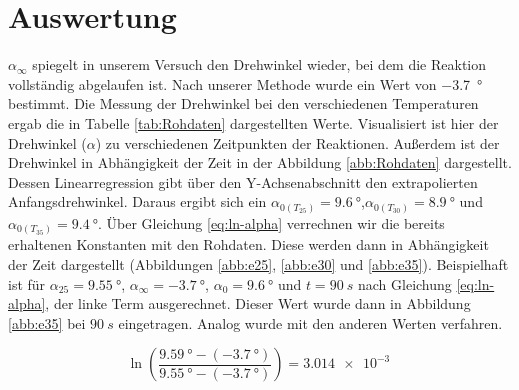 \section{Auswertung}
$\alpha_\infty$ spiegelt in unserem Versuch den Drehwinkel wieder, bei dem die Reaktion vollständig abgelaufen ist.
Nach unserer Methode wurde ein Wert von \qty{-3,7}{\degree} bestimmt.
Die Messung der Drehwinkel bei den verschiedenen Temperaturen ergab die in Tabelle \ref{tab:Rohdaten} dargestellten Werte.
Visualisiert ist hier der Drehwinkel ($\alpha$) zu verschiedenen Zeitpunkten der Reaktionen.
Außerdem ist der Drehwinkel in Abhängigkeit der Zeit in der Abbildung \ref{abb:Rohdaten} dargestellt.
Dessen Linearregression gibt über den Y-Achsenabschnitt den extrapolierten Anfangsdrehwinkel.
Daraus ergibt sich ein $\alpha_{0(T_{25})} = \qty{9,6}{\degree}$,$\alpha_{0(T_{30})} = \qty{8,9}{\degree}$ und $\alpha_{0(T_{35})} = \qty{9,4}{\degree}$.
Über Gleichung \ref{eq:ln-alpha} verrechnen wir die bereits erhaltenen Konstanten mit den Rohdaten. Diese werden dann in Abhängigkeit der Zeit dargestellt (Abbildungen \ref{abb:e25}, \ref{abb:e30} und \ref{abb:e35}). 
Beispielhaft ist für 
$\alpha_{25}=\qty{9,55}{\degree}$,
$\alpha_{\infty}=\qty{-3,7}{\degree}$, 
$\alpha_0=\qty{9,6}{\degree}$ 
und $t=90\ s$ nach Gleichung \ref{eq:ln-alpha}, der linke Term ausgerechnet.
Dieser Wert wurde dann in Abbildung \ref{abb:e35} bei $90\ s$ eingetragen. 
Analog wurde mit den anderen Werten verfahren.
 
\begin{equation}
	\ln \left( \frac{\qty{9.59}{\degree} -( \qty{-3.7}{\degree})}{\qty{9.55}{\degree} - (\qty{-3.7}{\degree}) }\right) = \qty{3,014e-3}{}
	\label{eqbsp:ln-aplha}
\end{equation}

